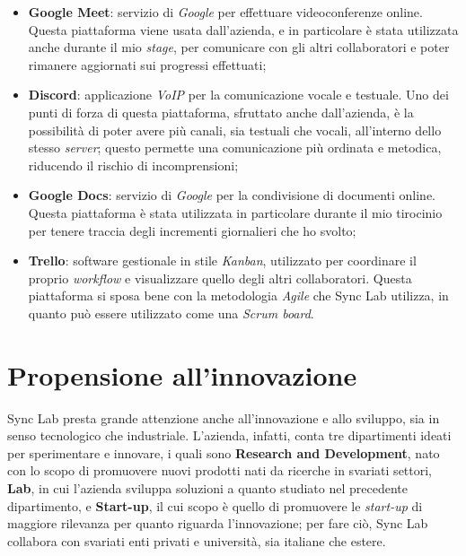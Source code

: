 \begin{itemize}
  \item \textbf{Google Meet}: servizio di \textit{Google} per effettuare videoconferenze online. Questa piattaforma viene usata dall'azienda, e in particolare è stata utilizzata anche durante il mio \textit{stage}, per comunicare con gli altri collaboratori e poter rimanere aggiornati sui progressi effettuati;

  \item \textbf{Discord}: applicazione \textit{VoIP} per la comunicazione vocale e testuale. Uno dei punti di forza di questa piattaforma, sfruttato anche dall'azienda, è la possibilità di poter avere più canali, sia testuali che vocali, all'interno dello stesso \textit{server}; questo permette una comunicazione più ordinata e metodica, riducendo il rischio di incomprensioni;

  \item \textbf{Google Docs}: servizio di \textit{Google} per la condivisione di documenti online. Questa piattaforma è stata utilizzata in particolare durante il mio tirocinio per tenere traccia degli incrementi giornalieri che ho svolto;

  \item \textbf{Trello}: software gestionale in stile \textit{Kanban}, utilizzato per coordinare il proprio \textit{workflow} e visualizzare quello degli altri collaboratori. Questa piattaforma si sposa bene con la metodologia \textit{Agile} che Sync Lab utilizza, in quanto può essere utilizzato come una \textit{Scrum board}.
\end{itemize}


\section{Propensione all'innovazione}

Sync Lab presta grande attenzione anche all'innovazione e allo sviluppo, sia in senso tecnologico che industriale. L'azienda, infatti, conta tre dipartimenti ideati per sperimentare e innovare, i quali sono \textbf{Research and Development}, nato con lo scopo di promuovere nuovi prodotti nati da ricerche in svariati settori, \textbf{Lab}, in cui l'azienda sviluppa soluzioni a quanto studiato nel precedente dipartimento, e \textbf{Start-up}, il cui scopo è quello di promuovere le \textit{start-up} di maggiore rilevanza per quanto riguarda l'innovazione; per fare ciò, Sync Lab collabora con svariati enti privati e università, sia italiane che estere.

